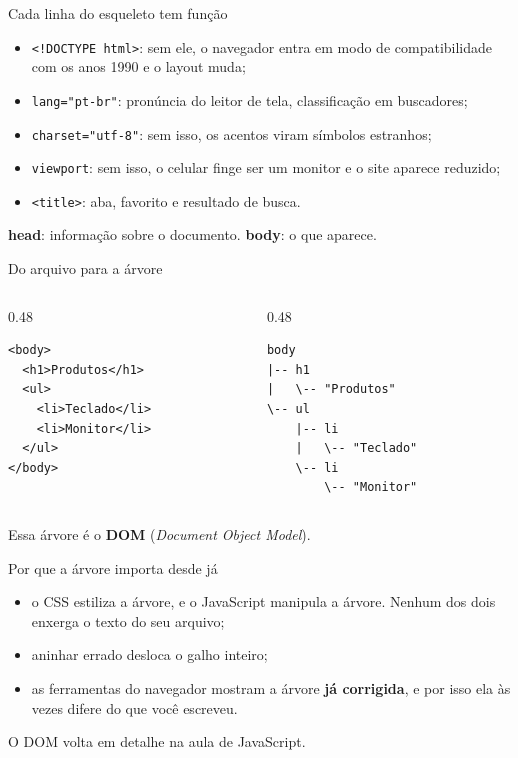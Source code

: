 \documentclass{beamer}
\begin{document}
\begin{frame}{Cada linha do esqueleto tem função}
  \begin{itemize}
    \item \texttt{<!DOCTYPE html>}: sem ele, o navegador entra em modo de
          compatibilidade com os anos 1990 e o layout muda;
    \item \texttt{lang="pt-br"}: pronúncia do leitor de tela, classificação em
          buscadores;
    \item \texttt{charset="utf-8"}: sem isso, os acentos viram símbolos
          estranhos;
    \item \texttt{viewport}: sem isso, o celular finge ser um monitor e o site
          aparece reduzido;
    \item \texttt{<title>}: aba, favorito e resultado de busca.
  \end{itemize}

  \vspace{0.3cm}
  \textbf{head}: informação sobre o documento. \quad \textbf{body}: o que aparece.
\end{frame}

\begin{frame}[fragile]{Do arquivo para a árvore}
  \begin{columns}[T]
    \begin{column}{0.48\textwidth}
      \begin{verbatim}
<body>
  <h1>Produtos</h1>
  <ul>
    <li>Teclado</li>
    <li>Monitor</li>
  </ul>
</body>
      \end{verbatim}
    \end{column}
    \begin{column}{0.48\textwidth}
      \begin{verbatim}
body
|-- h1
|   \-- "Produtos"
\-- ul
    |-- li
    |   \-- "Teclado"
    \-- li
        \-- "Monitor"
      \end{verbatim}
    \end{column}
  \end{columns}

  \vspace{0.4cm}
  Essa árvore é o \textbf{DOM} (\textit{Document Object Model}).
\end{frame}

\begin{frame}{Por que a árvore importa desde já}
  \begin{itemize}
    \item o CSS estiliza a árvore, e o JavaScript manipula a árvore. Nenhum dos
          dois enxerga o texto do seu arquivo;
    \item aninhar errado desloca o galho inteiro;
    \item as ferramentas do navegador mostram a árvore \textbf{já corrigida},
          e por isso ela às vezes difere do que você escreveu.
  \end{itemize}

  \vspace{0.5cm}
  O DOM volta em detalhe na aula de JavaScript.
\end{frame}
\end{document}
